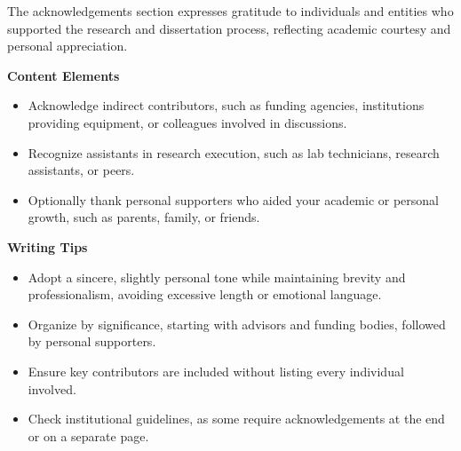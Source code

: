 The acknowledgements section expresses gratitude to individuals and entities who supported the research and dissertation process, reflecting academic courtesy and personal appreciation.
    
\textbf{Content Elements}
\begin{itemize}
    \item Acknowledge indirect contributors, such as funding agencies, institutions providing equipment, or colleagues involved in discussions.
    \item Recognize assistants in research execution, such as lab technicians, research assistants, or peers.
   \item Optionally thank personal supporters who aided your academic or personal growth, such as parents, family, or friends.

\end{itemize}

\bigskip
\textbf{Writing Tips}
\begin{itemize}
   \item Adopt a sincere, slightly personal tone while maintaining brevity and professionalism, avoiding excessive length or emotional language.
   \item Organize by significance, starting with advisors and funding bodies, followed by personal supporters.
   \item Ensure key contributors are included without listing every individual involved.
    \item Check institutional guidelines, as some require acknowledgements at the end or on a separate page.

\end{itemize}


